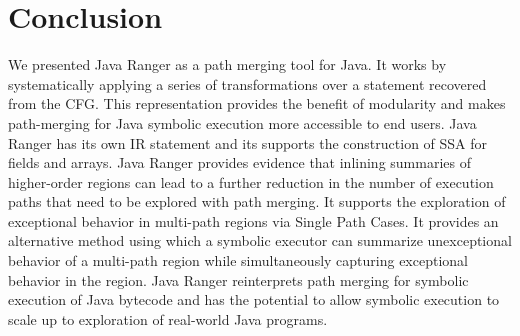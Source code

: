 \section{Conclusion}
\label{sec:future}

We presented Java Ranger as a path merging tool for Java.
%
It works by systematically applying a series of transformations over a statement recovered from the CFG. This
representation provides the benefit of modularity and makes path-merging for Java symbolic execution more accessible to
end users.
%
Java Ranger has its own IR statement and its supports the construction of SSA for fields and arrays.
%
Java Ranger provides evidence that inlining summaries of higher-order regions can lead to a further reduction in the
number of execution paths that need to be explored with path merging.
%
It supports the exploration of exceptional behavior in multi-path regions via Single Path Cases.
%
It provides an alternative method using which a symbolic executor can summarize unexceptional behavior of a multi-path
region while simultaneously capturing exceptional behavior in the region.
%
Java Ranger reinterprets path merging for symbolic execution of Java bytecode and has the potential to allow symbolic
execution to scale up to exploration of real-world Java programs.


